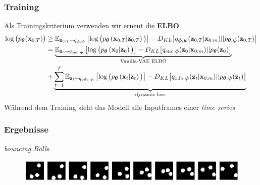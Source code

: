 \begin{frame}
    \frametitle{Training}
    Als Trainingskriterium verwenden wir erneut die \textbf{ELBO} 	
    	{\footnotesize\begin{align*}
            \log\big(p_{\boldsymbol{\theta}}(\mathbf{x}_{0:T})\big)&\ge \mathbb{E}_{\mathbf{z}_{0:T}\sim q_{\boldsymbol\phi,\boldsymbol\psi}}
            \left[\log\big(p_{\boldsymbol\theta}\left(\mathbf{x}_{0:T}|\mathbf{z}_{0:T}\right)\big)\right] - D_{KL}\big[q_{\boldsymbol\phi,\boldsymbol\psi}(\mathbf{z}_{0:T}|\mathbf{x}_{0:m})||p_{\boldsymbol\theta,\boldsymbol\psi}(\mathbf{z}_{0:T})\big]\\
            &=\underbrace{\mathbb{E}_{\mathbf{z}_{0}\sim q_{\text{enc }\boldsymbol\phi}}
    	    \left[\log\big(p_{\boldsymbol\theta}\left(\mathbf{x}_{0}|\mathbf{z}_{0}\right)\big)\right] - D_{KL}\big[q_{\text{enc }\boldsymbol\phi}(\mathbf{z}_{0}|\mathbf{x}_{0:m})||p_{\boldsymbol\theta}(\mathbf{z}_{0})\big]}_{\text{Vanilla-VAE ELBO}}\\ &+ \underbrace{\sum_{t=1}^T \mathbb{E}_{\mathbf{z}_{t}\sim q_{\text{ode }\boldsymbol\psi}}
    	    \left[\log\big(p_{\boldsymbol\theta}\left(\mathbf{x}_{t}|\mathbf{z}_{t}\right)\big)\right] - D_{KL}\big[q_{\text{ode }\boldsymbol\psi}(\mathbf{z}_{t}|\mathbf{x}_{0:m})||p_{\boldsymbol\theta,\boldsymbol\psi}(\mathbf{z}_{t})\big]}_{\text{dynamic loss}}
    \end{align*}}
    Während dem Training sieht das Modell alle Inputframes einer \emph{time series}
\end{frame}


\begin{frame}
    \frametitle{Ergebnisse}
    \emph{bouncing Balls}
    \begin{figure}[!htbp]
    	\centering
    	\includegraphics[scale=0.28]{Bilder/bouncingBalls}
    \end{figure}
\end{frame}




